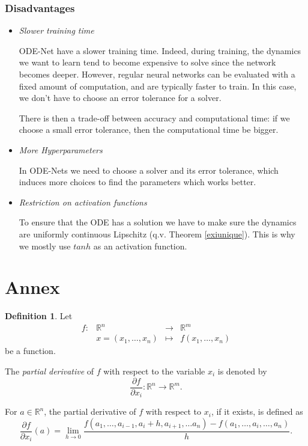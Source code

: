 \documentclass[10pt,a4paper]{article}
\theoremstyle{definition}
\newtheorem{definition}{Definition}
\theoremstyle{definition}
\theoremstyle{definition}
\begin{document}
\subsubsection*{Disadvantages}
\begin{itemize}
\item \textit{Slower training time}

ODE-Net have a slower training time. Indeed, during training, the dynamics we want to learn tend to become expensive to solve since the network becomes deeper. However, regular neural networks can be evaluated with a fixed amount of computation, and are typically faster to train. In this case, we don't have to choose an error tolerance for a solver.

There is then a trade-off between accuracy and computational time: if we choose a small error tolerance, then the computational time be bigger.

\item \textit{More Hyperparameters}

In ODE-Nets we need to choose a solver and its error tolerance, which induces more choices to find the parameters which works better.

\item \textit{Restriction on activation functions}

To ensure that the ODE has a solution we have to make sure the dynamics are uniformly continuous Lipschitz (q.v. Theorem \ref{exiunique}). This is why we mostly use $tanh$ as an activation function.
\end{itemize}

\section{Annex}\label{annex}

\begin{definition}
Let   $$\begin{array}{rclc}
f: & \mathbb{R}^n & \rightarrow &  \mathbb{R}^m \\
&x = (x_1, \dots, x_n) & \mapsto & f(x_1, \dots, x_n)
\end{array}$$ be a function.

The \textit{partial derivative} of $f$ with respect to the variable $x_i$ is denoted by
$$
\frac{\partial f}{\partial x_i} :\mathbb{R}^n \rightarrow \mathbb{R}^m.
$$

For $a\in \mathbb{R}^n$, the partial derivative of $f$ with respect to $x_i$, if it exists, is defined as
$$
\frac{\partial f}{\partial x_i}(a) = \lim_{h\rightarrow0}\frac{f(a_1,\dots , a_{i-1}, a_i + h, a_{i+1}, \dots a_n) - f(a_1,\dots, a_i,\dots, a_n)}{h}.
$$
\end{definition}
\end{document}
